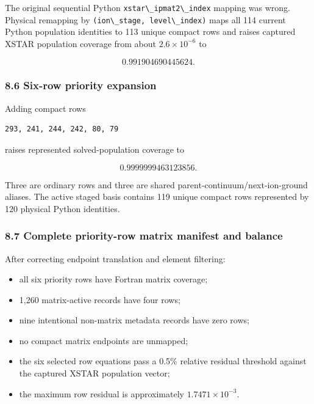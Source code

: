 \documentclass[
  10pt,
]{article}
\newcommand{\passthrough}[1]{#1}
\providecommand{\tightlist}{%
  \setlength{\itemsep}{0pt}\setlength{\parskip}{0pt}}
\begin{document}
The original sequential Python
\passthrough{\lstinline!xstar\_ipmat2\_index!} mapping was wrong.
Physical remapping by
\passthrough{\lstinline!(ion\_stage, level\_index)!} maps all 114
current Python population identities to 113 unique compact rows and
raises captured XSTAR population coverage from about
\(2.6\times10^{{-6}}\) to

\[
0.991904690445624.
\]

\subsubsection{8.6 Six-row priority
expansion}\label{six-row-priority-expansion}

Adding compact rows

\begin{lstlisting}
293, 241, 244, 242, 80, 79
\end{lstlisting}

raises represented solved-population coverage to

\[
0.9999999463123856.
\]

Three are ordinary rows and three are shared
parent-continuum/next-ion-ground aliases. The active staged basis
contains 119 unique compact rows represented by 120 physical Python
identities.

\subsubsection{8.7 Complete priority-row matrix manifest and
balance}\label{complete-priority-row-matrix-manifest-and-balance}

After correcting endpoint translation and element filtering:

\begin{itemize}
\tightlist
\item
  all six priority rows have Fortran matrix coverage;
\item
  1,260 matrix-active records have four rows;
\item
  nine intentional non-matrix metadata records have zero rows;
\item
  no compact matrix endpoints are unmapped;
\item
  the six selected row equations pass a 0.5\% relative residual
  threshold against the captured XSTAR population vector;
\item
  the maximum row residual is approximately \(1.7471\times10^{{-3}}\).
\end{itemize}
\end{document}
